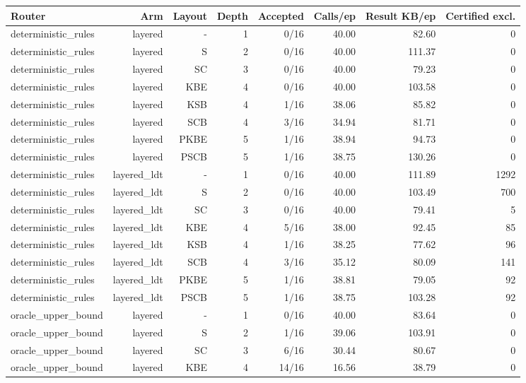 \begin{table}[t]
\centering
\small
\begin{adjustbox}{max width=\linewidth}
\begin{tabular}{lrrrrrrr}
\toprule
Router & Arm & Layout & Depth & Accepted & Calls/ep & Result KB/ep & Certified excl. \\
\midrule
deterministic\_rules & layered & - & 1 & 0/16 & 40.00 & 82.60 & 0 \\
deterministic\_rules & layered & S & 2 & 0/16 & 40.00 & 111.37 & 0 \\
deterministic\_rules & layered & SC & 3 & 0/16 & 40.00 & 79.23 & 0 \\
deterministic\_rules & layered & KBE & 4 & 0/16 & 40.00 & 103.58 & 0 \\
deterministic\_rules & layered & KSB & 4 & 1/16 & 38.06 & 85.82 & 0 \\
deterministic\_rules & layered & SCB & 4 & 3/16 & 34.94 & 81.71 & 0 \\
deterministic\_rules & layered & PKBE & 5 & 1/16 & 38.94 & 94.73 & 0 \\
deterministic\_rules & layered & PSCB & 5 & 1/16 & 38.75 & 130.26 & 0 \\
deterministic\_rules & layered\_ldt & - & 1 & 0/16 & 40.00 & 111.89 & 1292 \\
deterministic\_rules & layered\_ldt & S & 2 & 0/16 & 40.00 & 103.49 & 700 \\
deterministic\_rules & layered\_ldt & SC & 3 & 0/16 & 40.00 & 79.41 & 5 \\
deterministic\_rules & layered\_ldt & KBE & 4 & 5/16 & 38.00 & 92.45 & 85 \\
deterministic\_rules & layered\_ldt & KSB & 4 & 1/16 & 38.25 & 77.62 & 96 \\
deterministic\_rules & layered\_ldt & SCB & 4 & 3/16 & 35.12 & 80.09 & 141 \\
deterministic\_rules & layered\_ldt & PKBE & 5 & 1/16 & 38.81 & 79.05 & 92 \\
deterministic\_rules & layered\_ldt & PSCB & 5 & 1/16 & 38.75 & 103.28 & 92 \\
oracle\_upper\_bound & layered & - & 1 & 0/16 & 40.00 & 83.64 & 0 \\
oracle\_upper\_bound & layered & S & 2 & 1/16 & 39.06 & 103.91 & 0 \\
oracle\_upper\_bound & layered & SC & 3 & 6/16 & 30.44 & 80.67 & 0 \\
oracle\_upper\_bound & layered & KBE & 4 & 14/16 & 16.56 & 38.79 & 0 \\

\end{tabular}
\end{adjustbox}
\end{table}

